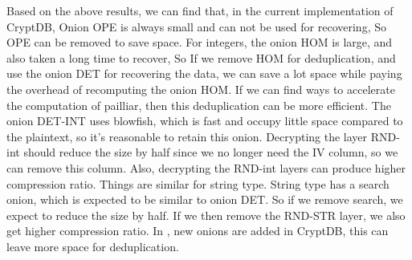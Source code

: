Based on the above results, we can find that, in the current implementation of CryptDB, Onion OPE is always small and can not be used for recovering, So OPE can be removed  to save space. For integers, the onion HOM is large, and also taken a long time to recover, So If we remove HOM for deduplication, and use the onion DET for recovering the data, we can save a lot space while paying the overhead of recomputing the onion HOM. If we can find ways to accelerate the computation of pailliar, then this deduplication can be more efficient. The onion DET-INT uses blowfish, which is fast and occupy little space compared to the plaintext, so it's reasonable to retain this onion. Decrypting the layer RND-int should reduce the size by half since we no longer need the IV column, so we can remove this column. Also, decrypting the RND-int layers can produce higher compression ratio. Things are similar for string type. String type has a search onion, which is expected to be similar to onion DET. So if we remove search, we expect to reduce the size by half. If we then remove the RND-STR layer, we also get higher compression ratio. In \citep{popa2015guidelines}, new onions are added in CryptDB, this can leave more space for deduplication.






